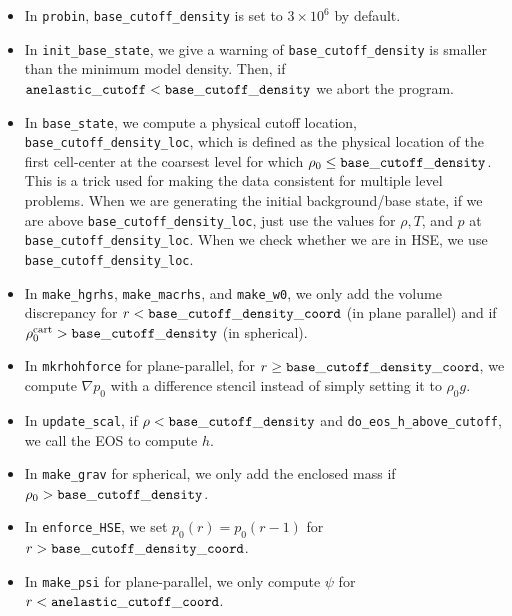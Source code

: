 \begin{itemize}

\item In {\tt probin}, {\tt base\_cutoff\_density} is set to $3\times 10^6$ by default.

\item In {\tt init\_base\_state}, we give a warning of {\tt base\_cutoff\_density}
  is smaller than the minimum model density.  Then, if ${\tt anelastic\_cutoff} 
  < {\tt base\_cutoff\_density}$ we abort the program.

\item In {\tt base\_state}, we compute a physical cutoff location,
  {\tt base\_cutoff\_density\_loc}, which is defined as the physical
  location of the first cell-center at the coarsest level for which
  $\rho_0 \le {\tt base\_cutoff\_density}$.  This is a trick used for making
  the data consistent for multiple level problems.  When we are generating the 
  initial background/base state, if we are above {\tt base\_cutoff\_density\_loc}, 
  just use the values for $\rho,T$, and $p$ at {\tt base\_cutoff\_density\_loc}.
  When we check whether we are in HSE, we use {\tt base\_cutoff\_density\_loc}.

\item In {\tt make\_hgrhs}, {\tt make\_macrhs}, and {\tt make\_w0}, 
  we only add the volume discrepancy for $r < {\tt base\_cutoff\_density\_coord}$
  (in plane parallel) and if $\rho_0^{\rm cart} > {\tt base\_cutoff\_density}$ 
  (in spherical).

\item In {\tt mkrhohforce} for plane-parallel, for
  $r \ge {\tt base\_cutoff\_density\_coord}$, we
  compute $\nabla p_0$ with a difference stencil instead of simply
  setting it to $\rho_0 g$.

\item In {\tt update\_scal}, if $\rho < {\tt base\_cutoff\_density}$
   and {\tt do\_eos\_h\_above\_cutoff}, we call the EOS to compute $h$.

\item In {\tt make\_grav} for spherical, we only add the enclosed mass if
  $\rho_0 > {\tt base\_cutoff\_density}$.

\item In {\tt enforce\_HSE}, we set $p_0(r) = p_0(r-1)$ for 
  $r > {\tt base\_cutoff\_density\_coord}$.

\item In {\tt make\_psi} for plane-parallel, we only compute $\psi$ for 
  $r < {\tt anelastic\_cutoff\_coord}$.

\end{itemize}

